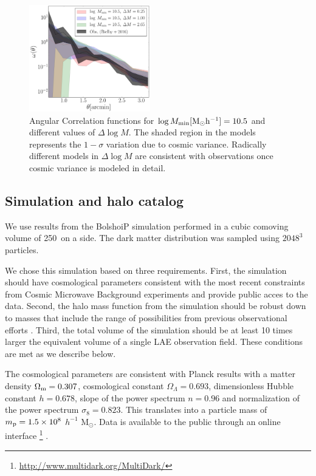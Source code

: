 \documentclass{emulateapj}
\newcommand{\hMpc}{{\ifmmode{h^{-1}{\rm Mpc}}\else{$h^{-1}$Mpc}\fi}}
\newcommand{\hMsun}{{\ifmmode{h^{-1}{\rm {M_{\odot}}}}\else{$h^{-1}{\rm{M_{\odot}}}$}\fi}}
\begin{document}
\begin{figure}
  \includegraphics[width=0.47\textwidth]{fig5.pdf}
\caption{ Angular Correlation functions for $\log M_{\rm
    min}[\rm{M_{\odot}h^{-1}}]=10.5$ and different values of $\Delta \log
  M$.  
  The shaded region in the models represents the $1-\sigma$ variation
  due to cosmic variance. Radically different models in $\Delta \log M$ are consistent with
  observations once cosmic variance is modeled in detail.} 
\label{fig:corr}
\end{figure}


\subsection{Simulation and halo catalog}
\label{subsec:sim}

We use results from the BolshoiP simulation \citep{Bolshoi,BolshoiP} 
performed in a cubic  comoving volume of 250\hMpc\  on a side. 
The dark matter distribution was sampled using  $2048^{3}$
particles. 

We chose this simulation based on three requirements. 
First, the simulation should have cosmological parameters consistent
with the most recent constraints from Cosmic Microwave Background
experiments and provide public acces to the data.
Second, the halo mass function from the simulation should be robust
down to masses that include the range of possibilities from previous
observational efforts \cite[e.g. results from][impose a lower bound of
  $10^{10}$\hMsun.]{Hayashino2004,Gawiser2007,Ouchi2010,Bielby16} .
Third, the total volume of the simulation should be at least 10 times
larger the equivalent volume of a single LAE observation field.
These conditions are met as we describe below. 

The cosmological parameters are consistent with Planck
results \citep{Planck2014} with a matter density 
$\Omega_{\rm m} = 0.307$, cosmological constant
$\Omega_{\Lambda}=0.693$, dimensionless Hubble constant $h=0.678$, slope
of the power spectrum  $n=0.96$ and normalization of the power
spectrum $\sigma_{8}=0.823$.  
This translates into a particle mass of  $m_{\rm p}=1.5\times 10^{8}$
$h^{-1}$ M$_{\odot}$. 
Data is available to the
public through an online
interface \footnote{\url{http://www.multidark.org/MultiDark/}}
\citep{MultiDark}.    
\end{document}
